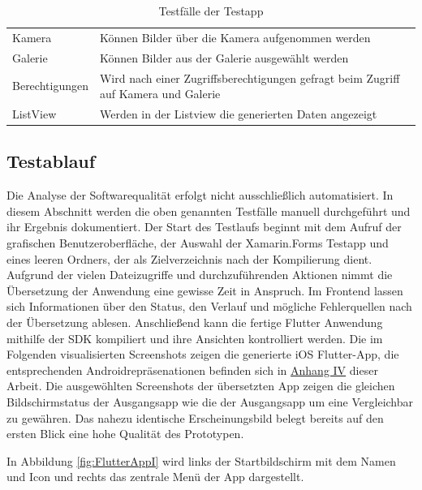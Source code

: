 \begin{table}[!ht]
\begin{tabularx}{\textwidth}{|l|X|}
Kamera			         				& Können Bilder über die Kamera aufgenommen werden\\ 
Galerie			         				& Können Bilder aus der Galerie ausgewählt werden                			 \\ 
Berechtigungen			         	& Wird nach einer Zugriffsberechtigungen gefragt beim Zugriff auf Kamera und Galerie \\ 
ListView					         	& Werden in der Listview die generierten Daten angezeigt                   			 \\ 
\hline
\end{tabularx}
	  \caption{Testfälle der Testapp}
 \label{tab:Testapp}
\end{table}

\subsection{Testablauf}
Die Analyse der Softwarequalität erfolgt nicht ausschließlich automatisiert.  In diesem Abschnitt werden die oben genannten Testfälle manuell durchgeführt und ihr Ergebnis dokumentiert.
Der Start  des Testlaufs beginnt mit dem Aufruf der grafischen Benutzeroberfläche,   der Auswahl der Xamarin.Forms Testapp und eines leeren Ordners, der als Zielverzeichnis nach der Kompilierung dient. 
Aufgrund der vielen Dateizugriffe und durchzuführenden Aktionen nimmt die Übersetzung der Anwendung eine gewisse Zeit in Anspruch. Im Frontend lassen sich Informationen über den Status, den Verlauf und mögliche Fehlerquellen nach der Übersetzung ablesen.  Anschließend kann die fertige Flutter Anwendung mithilfe der SDK kompiliert und ihre Ansichten kontrolliert werden.  Die im Folgenden visualisierten Screenshots zeigen die generierte iOS Flutter-App,  die entsprechenden Androidrepräsenationen befinden sich in  \hyperref[chap:AnhangAndroidScreenshotsFlutter]{Anhang IV} dieser Arbeit.  Die ausgewöhlten Screenshots der übersetzten App zeigen die gleichen Bildschirmstatus der Ausgangsapp wie die der Ausgangsapp um eine Vergleichbar zu gewähren.  Das nahezu identische Erscheinungsbild belegt bereits auf den ersten Blick eine hohe Qualität des Prototypen.  

In Abbildung \ref{fig:FlutterAppI} wird links der Startbildschirm mit dem Namen und Icon und rechts das zentrale Menü der App dargestellt. 

